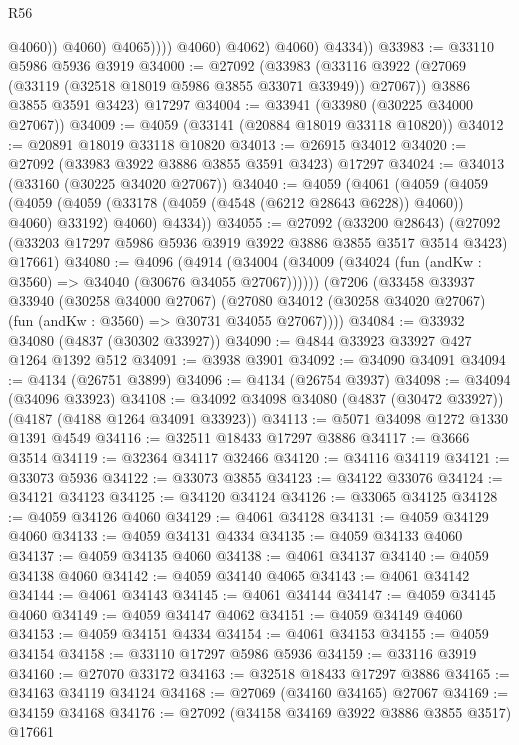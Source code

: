 \begin{lexlean}{R56}
\begin{coremodule}
                            @4060))
                        @4060)
                      @4065))))
              @4060)
            @4062)
          @4060)
        @4334))
@33983 := @33110 @5986 @5936 @3919
@34000 := @27092
    (@33983
      (@33116 @3922 (@27069 (@33119 (@32518 @18019 @5986 @3855 @33071 @33949)) @27067))
      @3886
      @3855
      @3591
      @3423)
    @17297
@34004 := @33941 (@33980 (@30225 @34000 @27067))
@34009 := @4059 (@33141 (@20884 @18019 @33118 @10820))
@34012 := @20891 @18019 @33118 @10820
@34013 := @26915 @34012
@34020 := @27092 (@33983 @3922 @3886 @3855 @3591 @3423) @17297
@34024 := @34013 (@33160 (@30225 @34020 @27067))
@34040 := @4059
    (@4061
      (@4059
        (@4059
          (@4059 (@4059 (@33178 (@4059 (@4548 (@6212 @28643 @6228)) @4060)) @4060) @33192)
          @4060)
        @4334))
@34055 := @27092
    (@33200 @28643)
    (@27092 (@33203 @17297 @5986 @5936 @3919 @3922 @3886 @3855 @3517 @3514 @3423) @17661)
@34080 := @4096
    (@4914 (@34004 (@34009 (@34024 (fun (andKw : @3560) => @34040 (@30676 @34055 @27067))))))
    (@7206
      (@33458
        @33937
        @33940
        (@30258 @34000 @27067)
        (@27080 @34012 (@30258 @34020 @27067) (fun (andKw : @3560) => @30731 @34055 @27067))))
@34084 := @33932 @34080 (@4837 (@30302 @33927))
@34090 := @4844 @33923 @33927 @427 @1264 @1392 @512
@34091 := @3938 @3901
@34092 := @34090 @34091
@34094 := @4134 (@26751 @3899)
@34096 := @4134 (@26754 @3937)
@34098 := @34094 (@34096 @33923)
@34108 := @34092 @34098 @34080 (@4837 (@30472 @33927)) (@4187 (@4188 @1264 @34091 @33923))
@34113 := @5071 @34098 @1272 @1330 @1391 @4549
@34116 := @32511 @18433 @17297 @3886
@34117 := @3666 @3514
@34119 := @32364 @34117 @32466
@34120 := @34116 @34119
@34121 := @33073 @5936
@34122 := @33073 @3855
@34123 := @34122 @33076
@34124 := @34121 @34123
@34125 := @34120 @34124
@34126 := @33065 @34125
@34128 := @4059 @34126 @4060
@34129 := @4061 @34128
@34131 := @4059 @34129 @4060
@34133 := @4059 @34131 @4334
@34135 := @4059 @34133 @4060
@34137 := @4059 @34135 @4060
@34138 := @4061 @34137
@34140 := @4059 @34138 @4060
@34142 := @4059 @34140 @4065
@34143 := @4061 @34142
@34144 := @4061 @34143
@34145 := @4061 @34144
@34147 := @4059 @34145 @4060
@34149 := @4059 @34147 @4062
@34151 := @4059 @34149 @4060
@34153 := @4059 @34151 @4334
@34154 := @4061 @34153
@34155 := @4059 @34154
@34158 := @33110 @17297 @5986 @5936
@34159 := @33116 @3919
@34160 := @27070 @33172
@34163 := @32518 @18433 @17297 @3886
@34165 := @34163 @34119 @34124
@34168 := @27069 (@34160 @34165) @27067
@34169 := @34159 @34168
@34176 := @27092 (@34158 @34169 @3922 @3886 @3855 @3517) @17661

\end{coremodule}
\end{lexlean}
